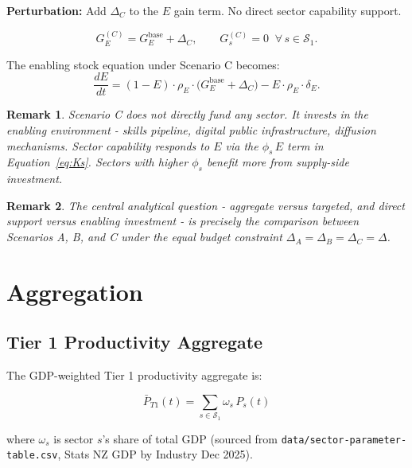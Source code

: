 \documentclass[11pt,a4paper]{article}
\newtheorem{remark}{Remark}
\begin{document}
\textbf{Perturbation:} Add $\Delta_C$ to the $E$ gain term. No direct sector capability support.

\begin{equation}
G_E^{(C)} = G_E^{\text{base}} + \Delta_C, \qquad G_s^{(C)} = 0\;\; \forall\, s \in \mathcal{S}_1.
\label{eq:scenC}
\end{equation}

The enabling stock equation under Scenario C becomes:
\[
\frac{dE}{dt}
= (1 - E)\cdot\rho_E\cdot\bigl(G_E^{\text{base}} + \Delta_C\bigr)
- E\cdot\rho_E\cdot\delta_E.
\]

\begin{remark}
Scenario C does not directly fund any sector. It invests in the enabling environment - skills pipeline, digital public infrastructure, diffusion mechanisms. Sector capability responds to $E$ via the $\phi_s\, E$ term in Equation~\eqref{eq:Ks}. Sectors with higher $\phi_s$ benefit more from supply-side investment.
\end{remark}

\begin{remark}
The central analytical question - aggregate versus targeted, and direct support versus enabling investment - is precisely the comparison between Scenarios A, B, and C under the equal budget constraint $\Delta_A = \Delta_B = \Delta_C = \Delta$.
\end{remark}

\section{Aggregation}
\label{sec:aggregation}

\subsection{Tier 1 Productivity Aggregate}

The GDP-weighted Tier 1 productivity aggregate is:

\begin{equation}
\bar{P}_{T1}(t) = \sum_{s \in \mathcal{S}_1} \omega_s\, P_s(t)
\label{eq:Pt1}
\end{equation}

where $\omega_s$ is sector $s$'s share of total GDP (sourced from \texttt{data/sector-parameter-table.csv}, Stats NZ GDP by Industry Dec 2025).
\end{document}
